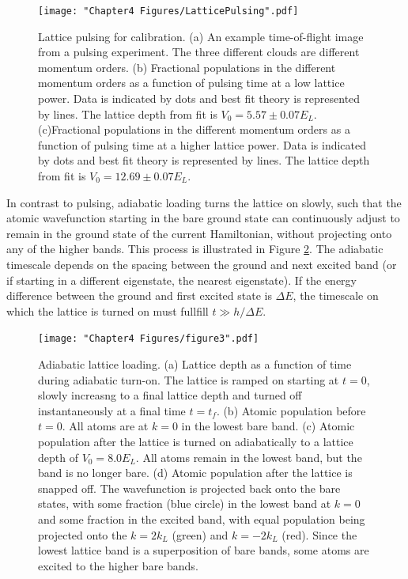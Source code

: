 \begin{figure}
	\texttt{[image: "Chapter4 Figures/LatticePulsing".pdf]}
\caption[Lattice pulsing for calibration]{Lattice pulsing for calibration. (a) An example time-of-flight image from a pulsing experiment. The three different clouds are different momentum orders. (b) Fractional populations in the different momentum orders as a function of pulsing time at a low lattice power. Data is indicated by dots and best fit theory is represented by lines. The lattice depth from fit is $V_0=5.57\pm0.07 E_L$. (c)Fractional populations in the different momentum orders as a function of pulsing time at a higher lattice power. Data is indicated by dots and best fit theory is represented by lines. The lattice depth from fit is $V_0=12.69\pm0.07 E_L$. }
\label{fig:latticePulsing}
\end{figure}

In contrast to pulsing, adiabatic loading turns the lattice on slowly, such that the atomic wavefunction starting in the bare ground state can continuously adjust to remain in the ground state of the current Hamiltonian, without projecting onto any of the higher bands. This process is illustrated in Figure \ref{fig:pulsingSchematic}. The adiabatic timescale depends on the spacing between the ground and next excited band (or if starting in a different eigenstate, the nearest eigenstate). If the energy difference between the ground and first excited state is $\Delta E$, the timescale on which the lattice is turned on must fullfill $t \gg h/\Delta E$.  

\begin{figure}
\texttt{[image: "Chapter4 Figures/figure3".pdf]}
\caption[Adiabatic lattice loading]{Adiabatic lattice loading. (a) Lattice depth as a function of time during adiabatic turn-on. The lattice is ramped on starting at $t=0$, slowly increasng to a final lattice depth and turned off instantaneously at a final time $t=t_f$. (b) Atomic population before $t=0$. All atoms are at $k=0$ in the lowest bare band. (c) Atomic population after the lattice is turned on adiabatically to a lattice depth of $V_0 = 8.0 E_L$. All atoms remain in the lowest band, but the band is no longer bare. (d) Atomic population after the lattice is snapped off. The wavefunction is projected back onto the bare states, with some fraction (blue circle) in the lowest band at $k=0$ and some fraction in the excited band, with equal population being projected onto the $k = 2 k_L$ (green) and $k=-2k_L$ (red). Since the lowest lattice band is a superposition of bare bands, some atoms are excited to the higher bare bands. }
\label{fig:pulsingSchematic}
\end{figure}


